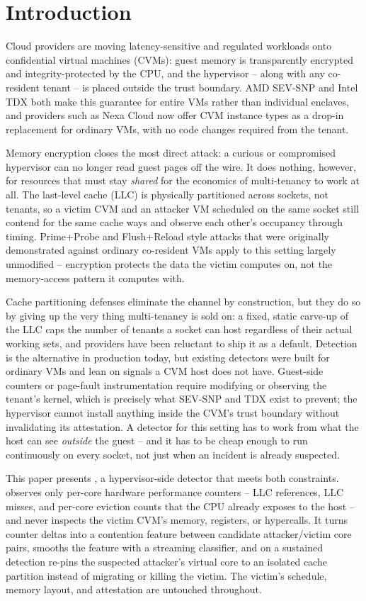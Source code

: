\section{Introduction}
\label{sec:intro}

Cloud providers are moving latency-sensitive and regulated workloads onto confidential
virtual machines (CVMs): guest memory is transparently encrypted and integrity-protected by
the CPU, and the hypervisor -- along with any co-resident tenant -- is placed outside the
trust boundary. AMD SEV-SNP and Intel TDX both make this guarantee for entire VMs rather than
individual enclaves, and providers such as Nexa Cloud now offer CVM instance types as a
drop-in replacement for ordinary VMs, with no code changes required from the tenant.

Memory encryption closes the most direct attack: a curious or compromised hypervisor can no
longer read guest pages off the wire. It does nothing, however, for resources that must stay
\emph{shared} for the economics of multi-tenancy to work at all. The last-level cache (LLC) is
physically partitioned across sockets, not tenants, so a victim CVM and an attacker VM
scheduled on the same socket still contend for the same cache ways and observe each other's
occupancy through timing. Prime+Probe and Flush+Reload style attacks that were originally
demonstrated against ordinary co-resident VMs apply to this setting largely unmodified --
encryption protects the data the victim computes on, not the memory-access pattern it computes
with.

Cache partitioning defenses eliminate the channel by construction, but they do so by giving
up the very thing multi-tenancy is sold on: a fixed, static carve-up of the LLC caps the
number of tenants a socket can host regardless of their actual working sets, and providers
have been reluctant to ship it as a default. Detection is the alternative in production today,
but existing detectors were built for ordinary VMs and lean on signals a CVM host does not
have. Guest-side counters or page-fault instrumentation require modifying or observing the
tenant's kernel, which is precisely what SEV-SNP and TDX exist to prevent; the hypervisor
cannot install anything inside the CVM's trust boundary without invalidating its attestation.
A detector for this setting has to work from what the host can see \emph{outside} the guest --
and it has to be cheap enough to run continuously on every socket, not just when an incident
is already suspected.

This paper presents \sysname, a hypervisor-side detector that meets both constraints. \sysname{}
observes only per-core hardware performance counters -- LLC references, LLC misses, and
per-core eviction counts that the CPU already exposes to the host -- and never inspects the
victim CVM's memory, registers, or hypercalls. It turns counter deltas into a contention
feature between candidate attacker/victim core pairs, smooths the feature with a streaming
classifier, and on a sustained detection re-pins the suspected attacker's virtual core to an
isolated cache partition instead of migrating or killing the victim. The victim's schedule,
memory layout, and attestation are untouched throughout.

